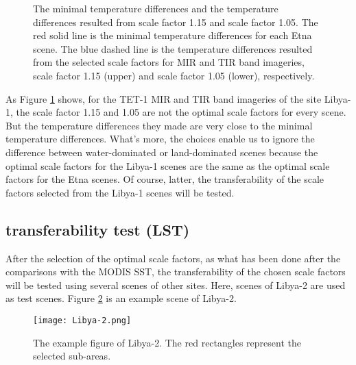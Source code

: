 \begin{figure}[!htbp]
\centering
{}
\hspace{0.5in}
\caption{The minimal temperature differences and the temperature differences resulted from scale factor 1.15 and scale factor 1.05. The red solid line is the minimal temperature differences for each Etna scene. The blue dashed line is the temperature differences resulted from the selected scale factors for MIR and TIR band imageries, scale factor 1.15 (upper) and scale factor 1.05 (lower), respectively.}
\label{fig:Lybia-1_bsc&temCom}
\end{figure}

\noindent As Figure \ref{fig:Lybia-1_bsc&temCom} shows, for the TET-1 MIR and TIR band imageries of the site Libya-1, the scale factor 1.15 and 1.05 are not the optimal scale factors for every scene. But the temperature differences they made are very close to the minimal temperature differences. What's more, the choices enable us to ignore the difference between water-dominated or land-dominated scenes because the optimal scale factors for the Libya-1 scenes are the same as the optimal scale factors for the Etna scenes. Of course, latter, the transferability of the scale factors selected from the Libya-1 scenes will be tested.\\


\subsection{transferability test (LST)}
After the selection of the optimal scale factors, as what has been done after the comparisons with the MODIS SST, the transferability of  the chosen scale factors will be tested using several scenes of other sites. Here, scenes of Libya-2 are used as test scenes. Figure \ref{fig:Libya2_sub_areas} is an example scene of Libya-2.\\

\begin{figure}[!htbp]
\centering
\texttt{[image: Libya-2.png]}
\caption{The example figure of Libya-2. The red rectangles represent the selected sub-areas.}
\label{fig:Libya2_sub_areas}
\end{figure}

